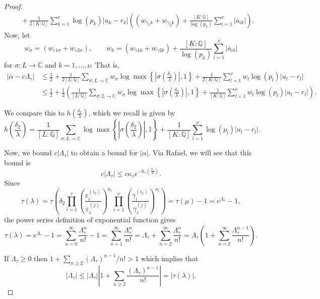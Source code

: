 \begin{proof}
\begin{align*}
	& \quad + \frac{1}{2[K:\mathbb{Q}]}\sum_{k = 1}^{\nu} \log(p_k)|u_k - r_k|\left( (w_{\gamma_1 k} + w_{\gamma_2 k}) + \frac{[K:\mathbb{Q}]}{\log(p_k)}\sum_{i=1}^{\nu}|\overline{a}_{ik}|\right).
\end{align*}
Now, let
\[w_{\sigma} = (w_{\varepsilon 1 \sigma} + w_{\varepsilon 2 \sigma}), \quad \quad w_k = (w_{\gamma 1 k} + w_{\gamma 2 k}) + \frac{[K:\mathbb{Q}]}{\log(p_k)}\sum_{i=1}^{\nu}|\overline{a}_{ik}|\]
for $\sigma: L \to \mathbb{C}$ and $k = 1, \dots, \nu$. That is, 
\begin{align*}
|\alpha-c\Lambda_\tau|
	& \leq \frac{1}{2} + \frac{1}{2[L:\mathbb{Q}]}\sum_{\sigma :L \to \mathbb{C}} w_{\sigma}\log \max \left\{ \left|\sigma\left(\frac{\delta_2}{\lambda}\right)\right|, 1\right\} + \frac{1}{2[K:\mathbb{Q}]}\sum_{l = 1}^{\nu}w_l \log(p_l)|u_l - r_l|\\
	& \leq \frac{1}{2} + \frac{1}{2}\left(\frac{1}{[L:\mathbb{Q}]}\sum_{\sigma :L \to \mathbb{C}} w_{\sigma}\log \max \left\{ \left|\sigma\left(\frac{\delta_2}{\lambda}\right)\right|, 1\right\} + \frac{1}{[K:\mathbb{Q}]}\sum_{l = 1}^{\nu}w_l \log(p_l)|u_l - r_l|\right).
\end{align*}

We compare this to $h\left(\frac{\delta_2}{\lambda}\right)$, which we recall is given by
\[h\left(\frac{\delta_2}{\lambda}\right) = \frac{1}{[L:\mathbb{Q}]}\sum_{\sigma :L \to \mathbb{C}} \log \max \left\{ \left|\sigma\left(\frac{\delta_2}{\lambda}\right)\right|, 1\right\} + \frac{1}{[K:\mathbb{Q}]}\sum_{l = 1}^{\nu} \log(p_l)|u_l - r_l|.\]

Now, we bound $c|\Lambda_{\tau}|$ to obtain a bound for $|\alpha|$. Via Rafael, we will see that this bound is
\[c|\Lambda_{\tau}| \leq c\kappa_{\tau}e^{-h_{\tau}\left(\frac{\delta_2}{\lambda}\right)}.\]
Since 
\[\tau(\lambda) = \tau\left(\delta_2 \prod_{i = 1}^{r}\left( \frac{\varepsilon_i^{(i_0)}}{\varepsilon_i^{(j)}}\right)^{a_i} \prod_{i = 1}^{\nu} \left( \frac{\gamma_i^{(i_0)}}{\gamma_i^{(j)}}\right)^{n_i} \right) = \tau(\mu) - 1 = e^{\Lambda_{\tau}} - 1,\]
the power series definition of exponential function gives
\[\tau(\lambda) = e^{\Lambda_{\tau}} - 1 = \sum_{n=0}^{\infty}\frac{\Lambda_{\tau}^n}{n!} - 1 = \sum_{n=1}^{\infty}\frac{\Lambda_{\tau}^n}{n!} = \Lambda_{\tau} + \sum_{n=2}^{\infty}\frac{\Lambda_{\tau}^{n}}{n!} = \Lambda_{\tau}\left( 1 + \sum_{n=2}^{\infty}\frac{\Lambda_{\tau}^{n-1}}{n!} \right).\]

If $\Lambda_\tau\geq 0$ then $1+\sum_{n\geq 2} (\Lambda_\tau)^{n-1}/n!>1$ which implies that 
\[|\Lambda_{\tau}| \leq |\Lambda_{\tau}|\left|1+\sum_{n\geq 2} \frac{(\Lambda_\tau)^{n-1}}{n!}\right| =|\tau(\lambda)| .\]


\end{proof}
